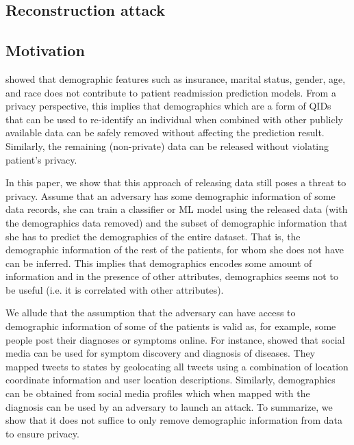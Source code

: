 \documentclass{bioinfo}
\begin{document}
\begin{methods}
\section{Reconstruction attack}
\label{sec:reconstructionattack}
\subsection{Motivation}
\label{sec:motivation}
\citet{tang2018predictive} showed that demographic features such as insurance, marital status, gender, age, and race does not contribute to patient readmission prediction models. From a privacy perspective, this implies that demographics which are a form of QIDs that can be used to re-identify an individual when combined with other publicly available data can be safely removed without affecting the prediction result. Similarly, the remaining (non-private) data can be released without violating patient's privacy. 

In this paper, we show that this approach of releasing data still poses a threat to privacy. Assume that an adversary has some demographic information of some data records, she can train a classifier or ML model using the released data (with the demographics data removed) and the subset of demographic information that she has to predict the demographics of the entire dataset. That is, the demographic information of the rest of the patients, for whom she does not have can be inferred. This implies that demographics encodes some amount of information and in the presence of other attributes, demographics seems not to be useful (i.e. it is correlated with other attributes).

We allude that the assumption that the adversary can have access to demographic information of some of the patients is valid as, for example, some people post their diagnoses or symptoms online. For instance, \citet{guntuku2020tracking} showed that social media can be used for symptom discovery and diagnosis of diseases. They mapped tweets to states by geolocating all tweets using a combination of location coordinate information and user location descriptions. Similarly, demographics can be obtained from social media profiles which when mapped with the diagnosis can be used by an adversary to launch an attack. To summarize, we show that it does not suffice to only remove demographic information from data to ensure privacy.



\end{methods}
\end{document}
